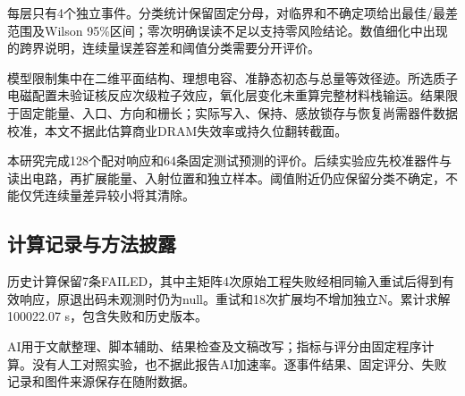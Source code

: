 \documentclass[UTF8,a4paper,zihao=-4,fontset=fandol]{ctexart}
\begin{document}
每层只有4个独立事件。分类统计保留固定分母，对临界和不确定项给出最佳/最差范围及Wilson 95\%区间；零次明确误读不足以支持零风险结论。数值细化中出现的跨界说明，连续量误差容差和阈值分类需要分开评价。

模型限制集中在二维平面结构、理想电容、准静态初态与总量等效径迹。所选质子电磁配置未验证核反应次级粒子效应，氧化层变化未重算完整材料栈输运。结果限于固定能量、入口、方向和栅长；实际写入、保持、感放锁存与恢复尚需器件数据校准，本文不据此估算商业DRAM失效率或持久位翻转截面。

本研究完成128个配对响应和64条固定测试预测的评价。后续实验应先校准器件与读出电路，再扩展能量、入射位置和独立样本。阈值附近仍应保留分类不确定，不能仅凭连续量差异较小将其清除。

\subsection*{计算记录与方法披露}
历史计算保留7条FAILED，其中主矩阵4次原始工程失败经相同输入重试后得到有效响应，原退出码未观测时仍为null。重试和18次扩展均不增加独立N。累计求解100022.07 s，包含失败和历史版本。

AI用于文献整理、脚本辅助、结果检查及文稿改写；指标与评分由固定程序计算。没有人工对照实验，也不据此报告AI加速率。逐事件结果、固定评分、失败记录和图件来源保存在随附数据\cite{project}。

\clearpage

{\small}
\end{document}
